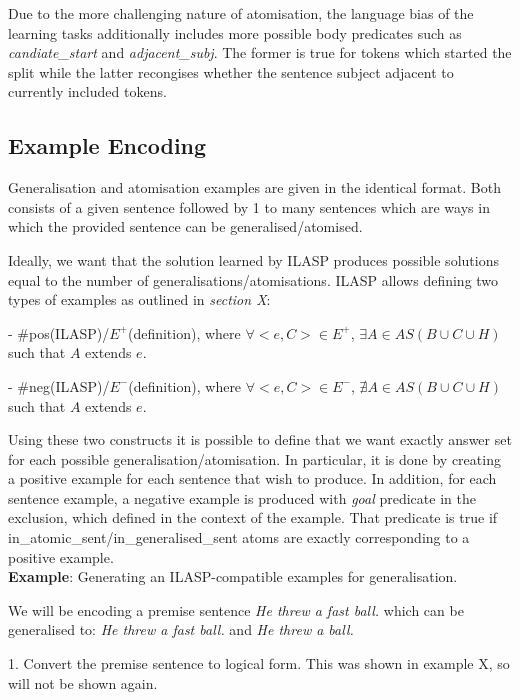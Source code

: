 Due to the more challenging nature of atomisation, the language bias of the learning tasks additionally includes more possible body predicates such as \emph{candiate\_start} and \emph{adjacent\_subj}.
The former is true for tokens which started the split while the latter recongises whether the sentence subject adjacent to currently included tokens.


\subsection{Example Encoding}

Generalisation and atomisation examples are given in the identical format.
Both consists of a given sentence followed by 1 to many sentences which are ways in which the provided sentence can be generalised/atomised.

Ideally, we want that the solution learned by ILASP produces possible solutions equal to the number of generalisations/atomisations.
ILASP allows defining two types of examples as outlined in \textit{section X}:


 - \#pos(ILASP)/$E^+$(definition), where $\forall<e, C> \in E^+$, $\exists A \in AS(B \cup C \cup H)$ such that $A$ extends $e$.
 
 - \#neg(ILASP)/$E^-$(definition), where $\forall<e, C> \in E^-$, $\nexists A \in AS(B \cup C \cup H)$ such that $A$ extends $e$.
 
Using these two constructs it is possible to define that we want exactly answer set for each possible generalisation/atomisation.
In particular, it is done by creating a positive example for each sentence that wish to produce. 
In addition, for each sentence example, a negative example is produced with \textit{goal} predicate in the exclusion, which defined in the context of the example. That predicate is true if in\_atomic\_sent/in\_generalised\_sent atoms are exactly corresponding to a positive example. \\


\textbf{Example}: Generating an ILASP-compatible examples for generalisation.

We will be encoding a premise sentence \textit{He threw a fast ball.} which can be generalised to: \textit{He threw a fast ball.} and \textit{He threw a ball.}

1. Convert the premise sentence to logical form. This was shown in example X, so will not be shown again. 

